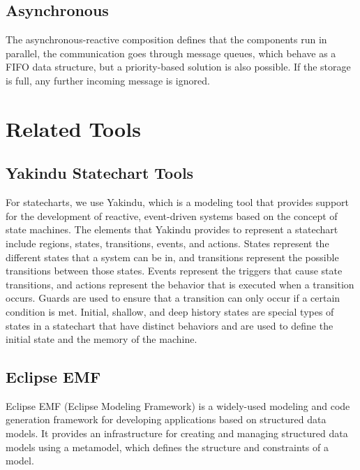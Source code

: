 \subsection{Asynchronous}

The asynchronous-reactive composition defines that the components run in parallel, the communication goes through message queues, which behave as a FIFO data structure, but a priority-based solution is also possible. If the storage is full, any further incoming message is ignored.

\newpage

\section{Related Tools}

\subsection{Yakindu Statechart Tools}

For statecharts, we use Yakindu, which is a modeling tool that provides support for the development of reactive, event-driven systems based on the concept of state machines. The elements that Yakindu provides to represent a statechart include regions, states, transitions, events, and actions. States represent the different states that a system can be in, and transitions represent the possible transitions between those states. Events represent the triggers that cause state transitions, and actions represent the behavior that is executed when a transition occurs. Guards are used to ensure that a transition can only occur if a certain condition is met. Initial, shallow, and deep history states are special types of states in a statechart that have distinct behaviors and are used to define the initial state and the memory of the machine.

\subsection{Eclipse EMF}

Eclipse EMF (Eclipse Modeling Framework) is a widely-used modeling and code generation framework for developing applications based on structured data models. It provides an infrastructure for creating and managing structured data models using a metamodel, which defines the structure and constraints of a model.

